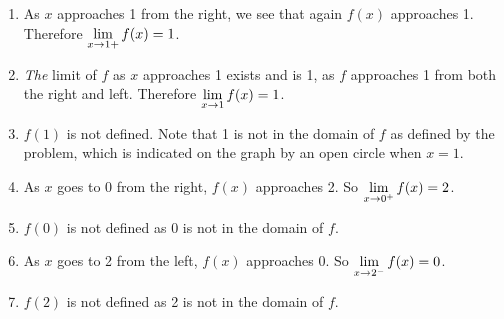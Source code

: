 \begin{example}
\begin{enumerate}
	\item	As $x$ approaches 1 from the right, we see that again $f(x)$ approaches 1. Therefore $\displaystyle \lim_{x\to 1+} f(x)=1$.
	\item	\emph{The} limit of $f$ as $x$ approaches 1 exists and is 1, as $f$ approaches 1 from both the right and left. Therefore $\displaystyle \lim_{x\to 1} f(x)=1$.
	\item	$f(1)$ is not defined. Note that 1 is not in the domain of $f$ as defined by the problem, which is indicated on the graph by an open circle when $x=1$.
	\item	As $x$ goes to 0 from the right, $f(x)$ approaches 2. So $\displaystyle \lim_{x\to 0^+} f(x)=2$.
	\item	$f(0)$  is not defined as $0$ is not in the domain of $f$.
	\item	As $x$ goes to 2 from the left, $f(x)$ approaches 0. So $\displaystyle \lim_{x\to 2^-} f(x)=0$.
	\item	$f(2)$  is not defined as 2 is not in the domain of $f$.
\end{enumerate}
\end{example}

